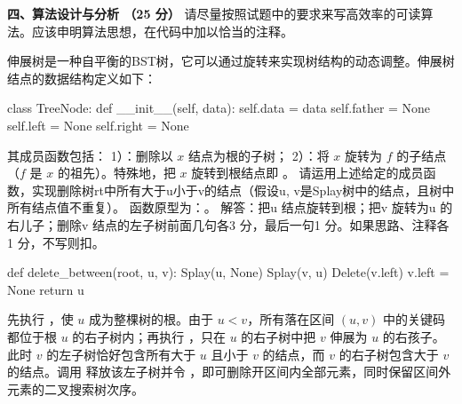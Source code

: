 \textbf{四、算法设计与分析 （25 分）}
请尽量按照试题中的要求来写高效率的可读算法。应该申明算法思想，在代码中加以恰当的注释。
\begin{question}
伸展树是一种自平衡的BST树，它可以通过旋转来实现树结构的动态调整。伸展树结点的数据结构定义如下：
\begin{pycode}
class TreeNode:
    def __init__(self, data):
        self.data = data
        self.father = None
        self.left = None
        self.right = None
\end{pycode}
其成员函数包括：
1）\texttt{}：删除以 $x$ 结点为根的子树；
2）\texttt{}：将 $x$ 旋转为 $f$ 的子结点（$f$ 是 $x$ 的祖先）。特殊地，把 $x$ 旋转到根结点即 \texttt{}。
请运用上述给定的成员函数，实现删除树rt中所有大于u小于v的结点（假设u, v是Splay树中的结点，且树中所有结点值不重复）。
函数原型为：\texttt{}。
解答：把u 结点旋转到根；把v 旋转为u 的右儿子；删除v 结点的左子树前面几句各3 分，最后一句1 分。如果思路、注释各1 分，不写则扣。
\begin{pycode}
def delete_between(root, u, v):
    Splay(u, None)
    Splay(v, u)
    Delete(v.left)
    v.left = None
    return u
\end{pycode}

\begin{solution}
先执行 \texttt{}，使 $u$ 成为整棵树的根。由于 $u<v$，所有落在区间 $(u,v)$ 中的关键码都位于根 $u$ 的右子树内；再执行 \texttt{}，只在 $u$ 的右子树中把 $v$ 伸展为 $u$ 的右孩子。此时 $v$ 的左子树恰好包含所有大于 $u$ 且小于 $v$ 的结点，而 $v$ 的右子树包含大于 $v$ 的结点。调用 \texttt{} 释放该左子树并令 \texttt{}，即可删除开区间内全部元素，同时保留区间外元素的二叉搜索树次序。
\end{solution}
\end{question}
